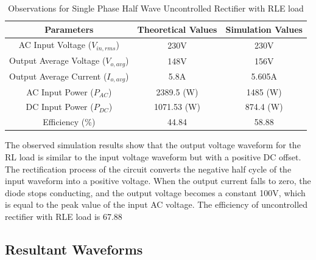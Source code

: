 \begin{table}[h]
    \renewcommand{\arraystretch}{1.3}

    \label{table_observation_single-phase-half-wave-uncontrolled-rectifier-with-RLE-load}
    \centering
    \begin{tabular}{|c|c|c|}
        \hline
        Parameters                              & Theoretical Values & Simulation Values \\
        \hline
        \hline
        AC Input Voltage ($ V_{in,rms} $)       & 230V               & 230V              \\
        \hline
        Output Average Voltage ($ V_{o,avg} $)  & 148V               & 156V            \\
        \hline
        Output Average Current ($ I_{o,avg}  $) & 5.8A               & 5.605A            \\
        \hline
        AC Input Power ($ P_{AC}  $)            & 2389.5 (W)         & 1485 (W)          \\
        \hline
        DC Input Power ($ P_{DC}  $)            & 1071.53 (W)        & 874.4 (W)         \\
        \hline
        Efficiency (\%)                         & 44.84              & 58.88             \\
        \hline
    \end{tabular}
    \caption{Observations for Single Phase Half Wave Uncontrolled Rectifier with RLE load}
\end{table}


The observed simulation results show that the output voltage waveform for the RL load is similar to the input voltage waveform but with a positive DC offset. The rectification process of the circuit converts the negative half cycle of the input waveform into a positive voltage. When the output current falls to zero, the diode stops conducting, and the output voltage becomes a constant 100V, which is equal to the peak value of the input AC voltage.
The efficiency of uncontrolled rectifier with RLE load is 67.88%

\pagebreak

\subsection{Resultant Waveforms}

